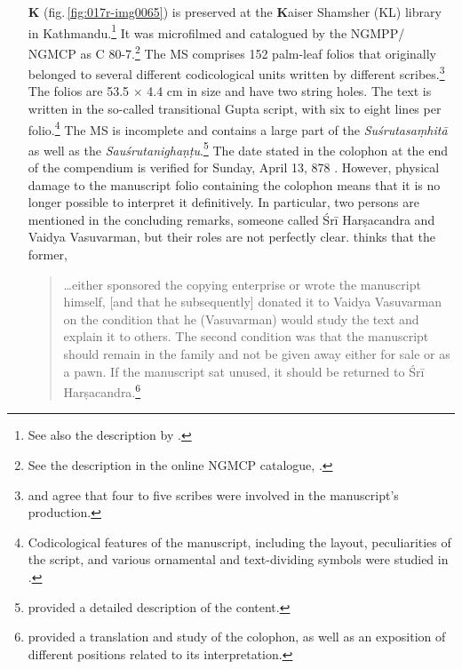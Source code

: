 \begin{itemize}
    
    \item[\textbf{K}]  (fig.\,\ref{fig:017r-img0065})
is preserved at the \textbf{K}aiser Shamsher (KL) library in
Kathmandu.\footnote{See also the description by \citet[\S
    2.1]{kleb-2021b}.}  It was microfilmed and catalogued by the NGMPP/
    NGMCP as C 80-7.\footnote{See the description in the online NGMCP
        catalogue, \cite{kh-c807}.} The MS comprises 152 palm-leaf folios that
        originally belonged to several different codicological units written by
        different scribes.\footnote{ \textcites[46]{bhat-2020} and
            \textcites[11]{kleb-2021b} agree that four to five scribes were involved
            in the manuscript's production.} The folios are 53.5 $\times$ 4.4 cm in
            size and have two string holes.  The text is written in the so-called
            transitional Gupta script, with six to eight lines per
            folio.\footnote{Codicological features of the manuscript, including the
                layout, peculiarities of the script, and various ornamental and
                text-dividing symbols were studied in \textcites{bhat-2020}.} The MS is
                incomplete and contains a large part of the \emph{Suśrutasaṃhitā} as
                well as the \emph{Sauśrutanighaṇṭu}.\footnote{\textcite[11]{kleb-2021b}
                    provided a detailed description of the content.} The date stated in the
                    colophon at the end of the compendium is verified for Sunday, April 13,
                    878 \CE. However, physical damage to the manuscript folio containing 
                    the
                    colophon means that it is no longer possible to interpret it
                    definitively.  In particular, two persons are mentioned in the
                    concluding remarks, someone called Śrī Harṣacandra and Vaidya
                    Vasuvarman, but their roles are not perfectly clear.
                    \textcites[16]{kleb-2021b} thinks that the former,
    \begin{quote}
        \ldots either sponsored the copying enterprise or wrote the manuscript himself,
        [and that he subsequently] donated it to Vaidya Vasuvarman on the condition that
        he (Vasuvarman) would study the text and explain it to others. The second
        condition was that the manuscript should remain in the family and not be given
        away either for sale or as a pawn. If the manuscript sat unused, it should be
        returned to Śrī Harṣacandra.\footnote{\textcite[13--17]{kleb-2021b} provided a
        translation and study of the colophon, as well as an exposition of different
        positions related to its interpretation.}
    \end{quote}
    

\end{itemize}
